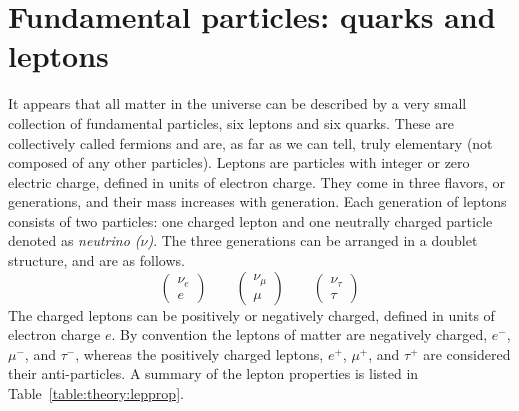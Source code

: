 \section{Fundamental particles: quarks and leptons}
It appears that all matter in the universe can be described by a very small collection of fundamental particles, six leptons and six quarks. These are collectively called fermions and are, as far as we can tell, truly elementary (not composed of any other particles).
Leptons are particles with integer or zero electric charge, defined in units of electron charge. They come in three flavors, or generations, and their mass increases with generation. Each generation of leptons consists of two particles: one charged lepton and one neutrally charged particle denoted as \emph{neutrino ($\nu$)}. The three generations can be arranged in a doublet structure, and are as follows.
\begin{equation}
\label{eqn:lepton_flavor_doublets}
\begin{pmatrix} \nu_e      \\ e      \end{pmatrix} \qquad
\begin{pmatrix} \nu_{\mu}  \\ \mu    \end{pmatrix} \qquad
\begin{pmatrix} \nu_{\tau} \\ \tau   \end{pmatrix}
\end{equation}
The charged leptons can be positively or negatively charged, defined in units of electron charge $e$. By convention the leptons of matter are negatively charged, $e^{-}$, $\mu^{-}$, and $\tau^{-}$,  whereas the positively charged leptons,  $e^{+}$, $\mu^{+}$, and $\tau^{+}$ are considered their anti-particles.
A summary of the lepton properties is listed in Table~\ref{table:theory:lepprop}.
